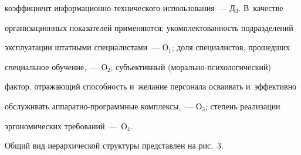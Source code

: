 \begin{enumerate}[(1)]
коэффициент информационно-технического использования~--- Д$_3$. В~качестве 

организационных показателей применяются: укомплектованность подразделений 

эксплуатации штатными специалистами~--- О$_1$; доля специалистов, прошедших 

специальное обучение,~--- О$_2$; субъективный (мо\-раль\-но-пси\-хо\-ло\-ги\-че\-ский) 

фактор, отражающий способность и~желание персонала осваивать и~эффективно 

обслуживать ап\-па\-рат\-но-про\-граммные комплексы,~--- О$_3$; степень реализации 

эргономических требований~---~О$_4$.

      \end{enumerate}

      

      Общий вид иерархической структуры представлен на рис.~3.

       

